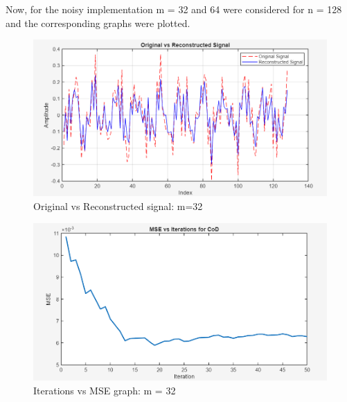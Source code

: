 \documentclass[
  letterpaper,
  DIV=11,
  numbers=noendperiod]{scrartcl}
\begin{document}
Now, for the noisy implementation m = 32 and 64 were considered for n =
128 and the corresponding graphs were plotted.

\begin{figure}[H]

{\centering \includegraphics[width=0.8\linewidth,height=\textheight,keepaspectratio]{abar-cs_files/mediabag/cod_m32_noisy1.png}

}

\caption{Original vs Reconstructed signal: m=32}

\end{figure}%

\begin{figure}[H]

{\centering \includegraphics[width=0.8\linewidth,height=\textheight,keepaspectratio]{abar-cs_files/mediabag/cod_m32_noisy_mse.png}

}

\caption{Iterations vs MSE graph: m = 32}

\end{figure}%
\end{document}
